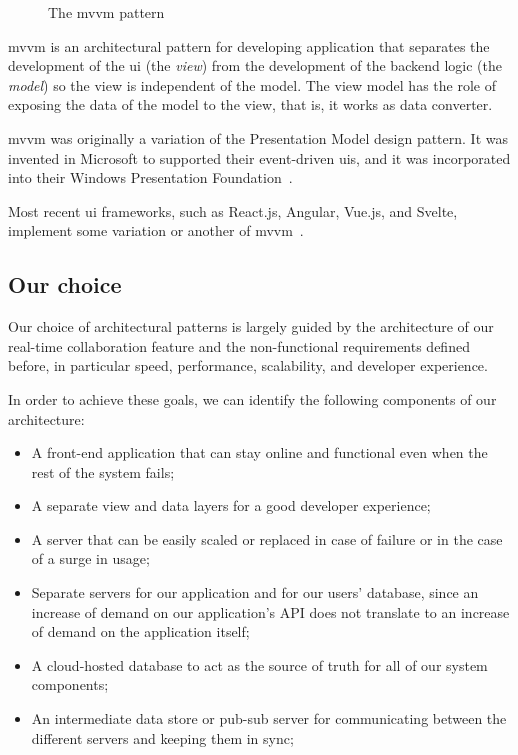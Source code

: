 \begin{toexclude}
\begin{figure}[H]

		\caption{The \acrshort{mvvm} pattern}
		\label{fig:mvvm-arch}
	\end{figure}

	\acrfull{mvvm} is an architectural pattern for developing application that separates the development of the \acrfull{ui} (the \emph{view}) from the development of the backend logic (the \emph{model}) so the view is independent of the model.
	The view model has the role of exposing the data of the model to the view, that is, it works as data converter.

	\acrshort{mvvm} was originally a variation of the Presentation Model design pattern. It was invented in Microsoft to supported their event-driven \acrshort{ui}s, and it was incorporated into their Windows Presentation Foundation~\autocite{smith_patterns_2009}.

	Most recent \acrshort{ui} frameworks, such as React.js, Angular, Vue.js, and Svelte, implement some variation or another of \acrshort{mvvm}~\autocite{noauthor_javascript_nodate}.

	\subsection{Our choice}

	Our choice of architectural patterns is largely guided by the architecture of our real-time collaboration feature and the non-functional requirements defined before, in particular speed, performance, scalability, and developer experience.

	In order to achieve these goals, we can identify the following components of our architecture:

	\begin{itemize}
		\item A front-end application that can stay online and functional even when the rest of the system fails;
		\item A separate view and data layers for a good developer experience;
		\item A server that can be easily scaled or replaced in case of failure or in the case of a surge in usage;
		\item Separate servers for our application and for our users' database, since an increase of demand on our application's API does not translate to an increase of demand on the application itself;
		\item A cloud-hosted database to act as the source of truth for all of our system components;
		\item An intermediate data store or pub-sub server for communicating between the different servers and keeping them in sync;
	\end{itemize}


\end{toexclude}
